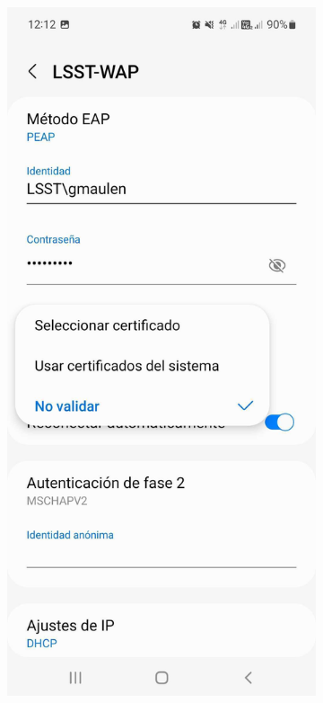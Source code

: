   \begin{figure}
    \centering
    \begin{subfigure}{0.40\textwidth}
      \includegraphics[width=\textwidth]{Images/Android3.jpg}

\end{subfigure}
\end{figure}
